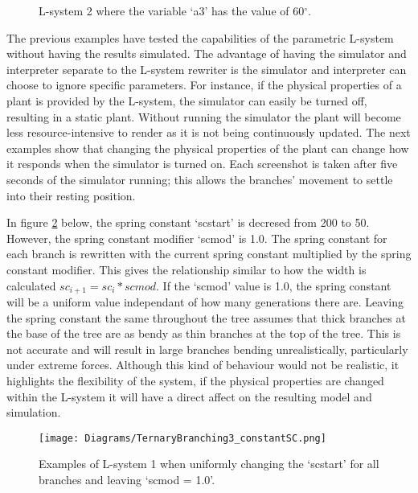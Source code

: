 \begin{figure}[htbp]
	{\centering
		\setlength{\fboxrule}{1pt}
		\vspace{7px}
		\caption{L-system 2 where the variable `a3' has the value of 60$^\circ$. } \label{extreme example angle}
	}
\end{figure}
\FloatBarrier

\noindent
The previous examples have tested the capabilities of the parametric L-system without having the results simulated. The advantage of having the simulator and interpreter separate to the L-system rewriter is the simulator and interpreter can choose to ignore specific parameters. For instance, if the physical properties of a plant is provided by the L-system, the simulator can easily be turned off, resulting in a static plant. Without running the simulator the plant will become less resource-intensive to render as it is not being continuously updated. The next examples show that changing the physical properties of the plant can change how it responds when the simulator is turned on. Each screenshot is taken after five seconds of the simulator running; this allows the branches' movement to settle into their resting position.

In figure \ref{constant spring} below, the spring constant `scstart' is decresed from 200 to 50.  However, the spring constant modifier `scmod' is 1.0. The spring constant for each branch is rewritten with the current spring constant multiplied by the spring constant modifier. This gives the relationship similar to how the width is calculated $sc_{i+1} = sc_i * scmod$. If the `scmod' value is 1.0, the spring constant will be a uniform value independant of how many generations there are. Leaving the spring constant the same throughout the tree assumes that thick branches at the base of the tree are as bendy as thin branches at the top of the tree. This is not accurate and will result in large branches bending unrealistically, particularly under extreme forces. Although this kind of behaviour would not be realistic, it highlights the flexibility of the system, if the physical properties are changed within the L-system it will have a direct affect on the resulting model and simulation.

\begin{figure}[htbp]
	{\centering
		\vspace{7px}
		\texttt{[image: Diagrams/TernaryBranching3\_constantSC.png]}
		\caption{Examples of L-system 1 when uniformly changing the `scstart' for all branches and leaving `scmod = 1.0'.}\label{constant spring}
	}
\end{figure}
\FloatBarrier

